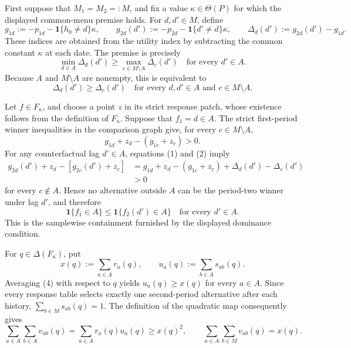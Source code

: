 First suppose that \(M_1=M_2=:M\), and fix a value \(\kappa\in\Theta(P)\) for which the displayed common-menu premise holds.  For \(d,d'\in M\), define
\[
 g_{1d}:=-p_{1d}-\mathbf 1\{h_0\ne d\}\kappa,
 \qquad
 g_{2d}(d'):=-p_{2d}-\mathbf 1\{d'\ne d\}\kappa,
 \qquad
 \Delta_d(d'):=g_{2d}(d')-g_{1d}.
\]
These indices are obtained from the utility index by subtracting the common constant \(\kappa\) at each date.  The premise is precisely
\[
 \min_{d\in A}\Delta_d(d')\ge
 \max_{c\in M\setminus A}\Delta_c(d')
 \quad\text{for every }d'\in A.
\]
Because \(A\) and \(M\setminus A\) are nonempty, this is equivalent to
\[
 \Delta_d(d')\ge \Delta_c(d')
 \quad
 \text{for every }d,d'\in A\text{ and }c\in M\setminus A.
\tag{1}
\]

Let \(f\in F_\kappa\), and choose a point \(z\) in its strict response patch, whose existence follows from the definition of \(F_\kappa\).  Suppose that \(f_1=d\in A\).  The strict first-period winner inequalities in the comparison graph give, for every \(c\in M\setminus A\),
\[
 g_{1d}+z_d-(g_{1c}+z_c)>0.
\tag{2}
\]
For any counterfactual lag \(d'\in A\), equations (1) and (2) imply
\[
 \begin{aligned}
 g_{2d}(d')+z_d-[g_{2c}(d')+z_c]
 &=g_{1d}+z_d-(g_{1c}+z_c)
   +\Delta_d(d')-\Delta_c(d')\\
 &>0
 \end{aligned}
\tag{3}
\]
for every \(c\notin A\).  Hence no alternative outside \(A\) can be the period-two winner under lag \(d'\), and therefore
\[
 \mathbf 1\{f_1\in A\}\le \mathbf 1\{f_2(d')\in A\}
 \quad\text{for every }d'\in A.
\tag{4}
\]
This is the samplewise containment furnished by the displayed dominance condition.

For \(q\in\Delta(F_\kappa)\), put
\[
 x(q):=\sum_{a\in A}r_a(q),
 \qquad
 u_a(q):=\sum_{b\in A}s_{ab}(q).
\]
Averaging (4) with respect to \(q\) yields \(u_a(q)\ge x(q)\) for every \(a\in A\).  Since every response table selects exactly one second-period alternative after each history,
\(\sum_{b\in M}s_{ab}(q)=1\).  The definition of the quadratic map consequently gives
\[
 \sum_{a\in A}\sum_{b\in A}v_{ab}(q)
 =\sum_{a\in A}r_a(q)u_a(q)
 \ge x(q)^2,
 \qquad
 \sum_{a\in A}\sum_{b\in M}v_{ab}(q)=x(q).
\tag{5}
\]


